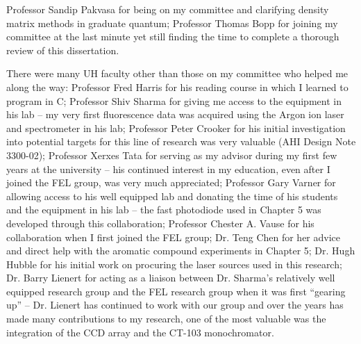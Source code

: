 \begin{acknowledgements}
Professor Sandip Pakvasa for being on my committee and clarifying density matrix methods in graduate quantum; Professor Thomas Bopp for joining my committee at the last minute yet still finding the time to complete a thorough review of this dissertation.

There were many UH faculty other than those on my committee who helped me along the way: Professor Fred Harris for his reading course in which I learned to program in C; Professor Shiv Sharma for giving me access to the equipment in his lab -- my very first fluorescence data was acquired using the Argon ion laser and spectrometer in his lab; Professor Peter Crooker for his initial investigation into potential targets for this line of research was very valuable (AHI Design Note 3300-02); Professor Xerxes Tata for serving as my advisor during my first few years at the university -- his continued interest in my education, even after I joined the FEL group, was very much appreciated; Professor Gary Varner for allowing access to his well equipped lab and donating the time of his students and the equipment in his lab -- the fast photodiode used in Chapter 5 was developed through this collaboration; Professor Chester A. Vause for his collaboration when I first joined the FEL group; Dr. Teng Chen for her advice and direct help with the aromatic compound experiments in Chapter 5; Dr. Hugh Hubble for his initial work on procuring the laser sources used in this research; Dr. Barry Lienert for acting as a liaison between Dr. Sharma's relatively well equipped research group and the FEL research group when it was first ``gearing up'' -- Dr. Lienert has continued to work with our group and over the years has made many contributions to my research, one of the most valuable was the integration of the CCD array and the CT-103 monochromator.


\end{acknowledgements}
